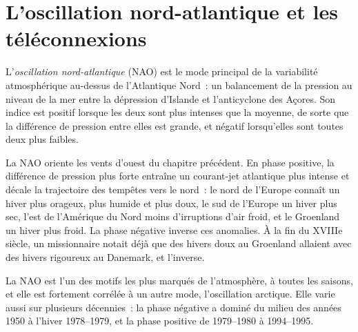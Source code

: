 \section{L'oscillation nord-atlantique et les téléconnexions}\label{sec:b2:climate-variability:nao}

\begin{definition}\label{def:b2:climate-variability:nao}
L'\emph{oscillation nord-atlantique} (NAO) est le mode principal de la variabilité atmosphérique
au-dessus de l'Atlantique Nord~: un balancement de la pression au niveau de la mer entre la dépression d'Islande et l'anticyclone
des Açores. Son indice est positif lorsque les deux sont plus intenses que la moyenne, de sorte que la différence de pression
entre elles est grande, et négatif lorsqu'elles sont toutes deux plus faibles.
\end{definition}

La NAO oriente les vents d'ouest du chapitre précédent. En phase positive, la différence de pression plus forte
entraîne un courant-jet atlantique plus intense et décale la trajectoire des tempêtes vers le nord~: le nord de l'Europe connaît
un hiver plus orageux, plus humide et plus doux, le sud de l'Europe un hiver plus sec, l'est de l'Amérique du Nord moins
d'irruptions d'air froid, et le Groenland un hiver plus froid. La phase négative inverse ces anomalies. À la fin du
XVIIIe siècle, un missionnaire notait déjà que des hivers doux au Groenland allaient avec des hivers rigoureux au Danemark, et
l'inverse.

La NAO est l'un des motifs les plus marqués de l'atmosphère, à toutes les saisons, et elle est fortement corrélée à un autre
mode, l'oscillation arctique. Elle varie aussi sur plusieurs décennies~: la phase négative a dominé du milieu des années 1950
à l'hiver 1978--1979, et la phase positive de 1979--1980 à 1994--1995.

